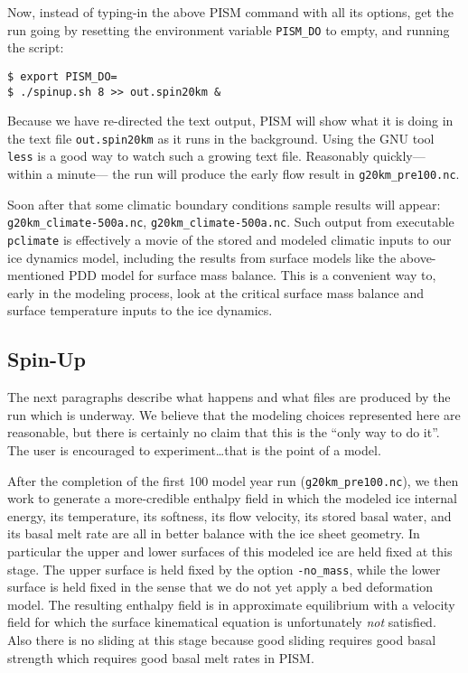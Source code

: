 Now, instead of typing-in the above PISM command with all its options, get the run going by resetting the environment variable \texttt{PISM_DO} to empty, and running the script:
\begin{verbatim}
$ export PISM_DO=
$ ./spinup.sh 8 >> out.spin20km &
\end{verbatim}
\noindent Because we have re-directed the text output, PISM will show what it is doing in the text file \texttt{out.spin20km} as it runs in the background.  Using the GNU tool \texttt{less} is a good way to watch such a growing text file.  Reasonably quickly--- within a minute--- the run will produce the early flow result in \texttt{g20km_pre100.nc}.

Soon after that some climatic boundary conditions sample results will appear: \texttt{g20km_climate-500a.nc}, \texttt{g20km_climate-500a.nc}.  Such output from executable \texttt{pclimate} is effectively a movie of the stored and modeled climatic inputs to our ice dynamics model, including the results from surface models like the above-mentioned PDD model for surface mass balance.  This is a convenient way to, early in the modeling process, look at the critical surface mass balance and surface temperature inputs to the ice dynamics.

\subsection{Spin-Up}  \label{subsect:spinupsketch}  The next paragraphs describe what happens and what files are produced by the run which is underway.  We believe that the modeling choices represented here are reasonable, but there is certainly no claim that this is the ``only way to do it''.  The user is encouraged to experiment\dots that is the point of a model.

After the completion of the first 100 model year run (\texttt{g20km_pre100.nc}), we then work to generate a more-credible enthalpy field in which the modeled ice internal energy, its temperature, its softness, its flow velocity, its stored basal water, and its basal melt rate are all in better balance with the ice sheet geometry.  In particular the upper and lower surfaces of this modeled ice are held fixed at this stage.  The upper surface is held fixed by the option \texttt{-no_mass}, while the lower surface is held fixed in the sense that we do not yet apply a bed deformation model.  The resulting enthalpy field is in approximate equilibrium with a velocity field for which the surface kinematical equation \cite{Fowler} is unfortunately \emph{not} satisfied.  Also there is no sliding at this stage because good sliding requires good basal strength which requires good basal melt rates in PISM.

